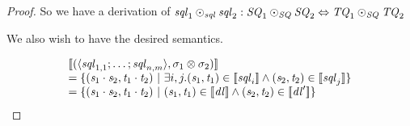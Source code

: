 \documentclass[numbers,10pt,preprint\ifanon ,nocopyrightspace\fi]{sigplanconf}
\begin{document}
\begin{proof}
  So we have a derivation of $\mathit{sql}_1\odot_{\mathit{sql}}\mathit{sql}_2 :
  \mathit{SQ}_1\odot_{\mathit{SQ}}\mathit{SQ}_2 \Leftrightarrow
  \mathit{TQ}_1\odot_{\mathit{SQ}}\mathit{TQ}_2$

  We also wish to have the desired semantics.

  \[
    \begin{array}{l}
      \SemanticsOf{(\DNFLensOf{\SequenceLens_{1,1};\ldots;\SequenceLens_{n,m}},
      \DistributePermutationOf{\sigma_1}{\sigma_2})}\\
      = \SetOf{(\String_1\Concat\String_2,\StringAlt_1\Concat\StringAlt_2)
      \SuchThat \exists i,j. (\String_1,\StringAlt_1) \in
      \SemanticsOf{\SequenceLens_i} \BooleanAnd (\String_2,\StringAlt_2) \in
      \SemanticsOf{\SequenceLens_j}}\\
      = \SetOf{(\String_1\Concat\String_2,\StringAlt_1\Concat\StringAlt_2)
      \SuchThat (\String_1,\StringAlt_1) \in
      \SemanticsOf{\DNFLens} \BooleanAnd (\String_2,\StringAlt_2) \in
      \SemanticsOf{\DNFLens'}}
    \end{array}
  \]
\end{proof}
\end{document}
